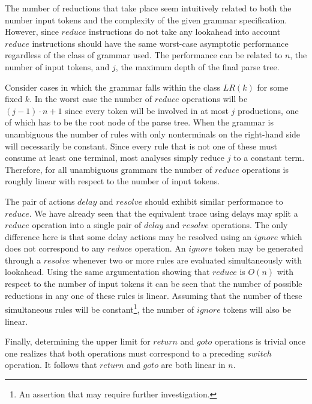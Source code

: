 \documentclass[a4paper,11pt]{article}
\begin{document}
The number of reductions that take place seem intuitively related to both the number input tokens and the complexity of the given grammar specification.
However, since $reduce$ instructions do not take any lookahead into account $reduce$ instructions should have the same worst-case asymptotic performance regardless of the class of grammar used.
The performance can be related to $n$, the number of input tokens, and $j$, the maximum depth of the final parse tree.

Consider cases in which the grammar falls within the class $LR(k)$ for some fixed $k$.
In the worst case the number of $reduce$ operations will be $(j - 1) \cdot n + 1$ since every token will be involved in at most $j$ productions, one of which has to be the root node of the parse tree.
When the grammar is unambiguous the number of rules with only nonterminals on the right-hand side will necessarily be constant.
Since every rule that is not one of these must consume at least one terminal, most analyses simply reduce $j$ to a constant term.
Therefore, for all unambiguous grammars the number of $reduce$ operations is roughly linear with respect to the number of input tokens.


The pair of actions $delay$ and $resolve$ should exhibit similar performance to $reduce$.
We have already seen that the equivalent trace using delays may split a $reduce$ operation into a single pair of $delay$ and $resolve$ operations.
The only difference here is that some delay actions may be resolved using an $ignore$ which does not correspond to any $reduce$ operation.
An $ignore$ token may be generated through a $resolve$ whenever two or more rules are evaluated simultaneously with lookahead. 
Using the same argumentation showing that $reduce$ is $O(n)$ with respect to the number of input tokens it can be seen that the number of possible reductions in any one of these rules is linear.
Assuming that the number of these simultaneous rules will be constant\footnote{An assertion that may require further investigation.}, the number of $ignore$ tokens will also be linear.

Finally, determining the upper limit for $return$ and $goto$ operations is trivial once one realizes that both operations must correspond to a preceding $switch$ operation. 
It follows that $return$ and $goto$ are both linear in $n$.\\
\end{document}
